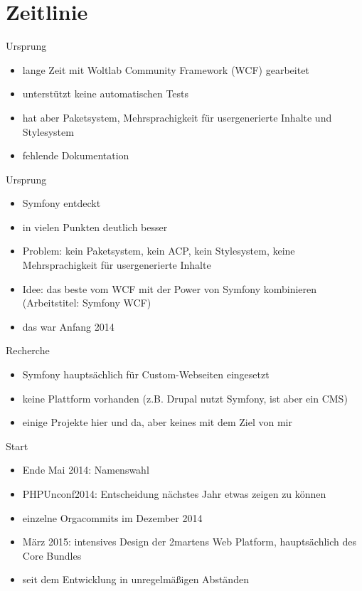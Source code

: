\documentclass{beamer}
\begin{document}
\section{Zeitlinie}
\begin{frame}{Ursprung}
  \begin{itemize}
    \item lange Zeit mit Woltlab Community Framework (WCF) gearbeitet
    \item unterstützt keine automatischen Tests
    \item hat aber Paketsystem, Mehrsprachigkeit für usergenerierte Inhalte und Stylesystem
    \item fehlende Dokumentation
  \end{itemize}
\end{frame}
\begin{frame}{Ursprung}
  \begin{itemize}
    \item Symfony entdeckt
    \item in vielen Punkten deutlich besser
    \item Problem: kein Paketsystem, kein ACP, kein Stylesystem, keine Mehrsprachigkeit für usergenerierte Inhalte
    \item Idee: das beste vom WCF mit der Power von Symfony kombinieren (Arbeitstitel: Symfony WCF)
    \item das war Anfang 2014
  \end{itemize}
\end{frame}
\begin{frame}{Recherche}
  \begin{itemize}
    \item Symfony hauptsächlich für Custom-Webseiten eingesetzt
    \item keine Plattform vorhanden (z.B. Drupal nutzt Symfony, ist aber ein CMS)
    \item einige Projekte hier und da, aber keines mit dem Ziel von mir
  \end{itemize}
\end{frame}
\begin{frame}{Start}
  \begin{itemize}
    \item Ende Mai 2014: Namenswahl
    \item PHPUnconf2014: Entscheidung nächstes Jahr etwas zeigen zu können
    \item einzelne Orgacommits im Dezember 2014
    \item März 2015: intensives Design der 2martens Web Platform, hauptsächlich des Core Bundles
    \item seit dem Entwicklung in unregelmäßigen Abständen
  \end{itemize}
\end{frame}
\end{document}
